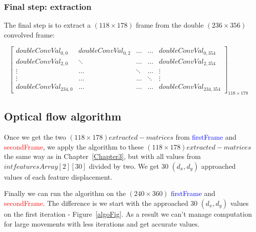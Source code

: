 \vspace{5mm}



\subsubsection{Final step: extraction}

The final step is to extract a $(118\times 178)$ frame from the double $(236\times 356)$ convolved frame:

\vspace{5mm}
\[
\begin{bmatrix}

doubleConvVal_{0,0} & doubleConvVal_{0,2} & \ldots & \ldots & doubleConvVal_{0,354}\\

doubleConvVal_{2,0} & \ddots & \ldots & \ldots & doubleConvVal_{2,354}\\

\vdots & \ldots & \ddots & \ldots & \vdots\\

\vdots & \ldots & \ldots & \ddots & \vdots\\

doubleConvVal_{234,0} & \ldots & \ldots  & \ldots & doubleConvVal_{234,354}

\end{bmatrix}_{118\times 178}
\]


\subsection{Optical flow algorithm}

Once we get the two $(118\times 178)extracted-matrices$ from \textcolor{blue}{firstFrame} and \textcolor{red}{secondFrame}, we apply the \flow{} algorithm to these $(118\times 178)extracted-matrices$ the same way as in Chapter~\ref{Chapter3}, but with all values from $int featuresArray[2][30]$ divided by two. We get 30 $(d_{x},d_{y})$ approached values of each feature displacement.

Finally we can run the \flow{} algorithm on the $(240\times 360)$ \textcolor{blue}{firstFrame} and \textcolor{red}{secondFrame}. The difference is we start with the approached 30 $(d_{x},d_{y})$ values on the first iteration - Figure~\ref{algoFig}. As a result we can't manage \flow{} computation for large movements with less iterations and get accurate values.


